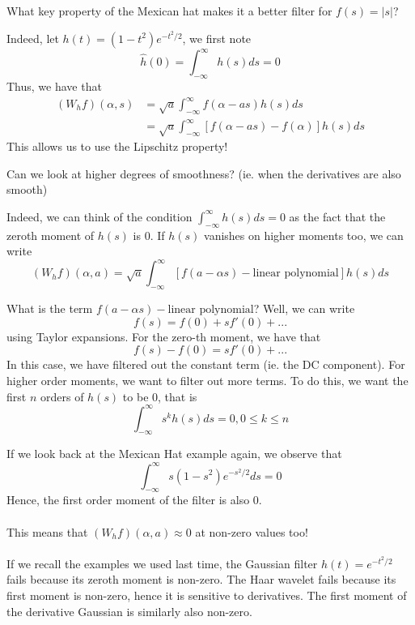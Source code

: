 \documentclass{article}
\begin{document}
\begin{question}
    What key property of the Mexican hat makes it a better filter for $f(s) = |s|$?
\end{question}

Indeed, let $h(t) = (1 - t^2) e^{-t^2/2}$, we first note 
\[\widehat{h}(0) = \int_{-\infty}^\infty h(s) ds = 0\]
Thus, we have that
\begin{align*}
    (W_h f)(\alpha, s) &= \sqrt{a} \int_{-\infty}^\infty f(\alpha - as) h(s) ds\\
    &= \sqrt{a} \int_{-\infty}^\infty [f(\alpha - as) - f(\alpha)] h(s) ds
\end{align*}
This allows us to use the Lipschitz property!

\begin{question}
    Can we look at higher degrees of smoothness? (ie. when the derivatives are also smooth)
\end{question}

Indeed, we can think of the condition $\int_{-\infty}^\infty h(s) ds = 0$ as the fact that the zeroth moment of $h(s)$ is $0$. If $h(s)$ vanishes on higher moments too, we can write
\[(W_h f)(\alpha, a) = \sqrt{a} \int_{-\infty}^\infty [f(a - \alpha s) - \text{linear polynomial}] h(s) ds\]

What is the term $f(a - \alpha s) - \text{linear polynomial}$? Well, we can write 
\[f(s) = f(0) + s f'(0) + ...\]
using Taylor expansions. For the zero-th moment, we have that
\[f(s) - f(0) = s f'(0) + ... \]
In this case, we have filtered out the constant term (ie. the DC component). For higher order moments, we want to filter out more terms. To do this, we want the first $n$ orders of $h(s)$ to be $0$, that is
\[\int_{-\infty}^\infty s^k h(s) ds = 0, 0 \leq k \leq n\]

\begin{example}
    If we look back at the Mexican Hat example again, we observe that
    \[\int_{-\infty}^\infty s (1 - s^2) e^{-s^2/2} ds = 0\]
    Hence, the first order moment of the filter is also $0$.\\\\
    This means that $(W_h f)(\alpha, a) \approx 0$ at non-zero values too!\\\\
    If we recall the examples we used last time, the Gaussian filter $h(t) = e^{-t^2/2}$ fails because its zeroth moment is non-zero. The Haar wavelet fails because its first moment is non-zero, hence it is sensitive to derivatives. The first moment of the derivative Gaussian is similarly also non-zero.
\end{example}
\end{document}
